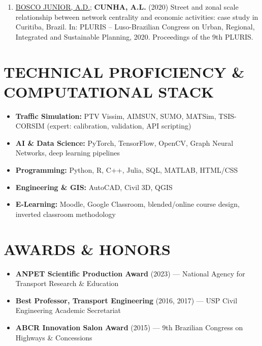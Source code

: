 \documentclass[
  10pt,
  a4paper,
  DIV=11,
  numbers=noendperiod]{scrartcl}
\providecommand{\tightlist}{%
  \setlength{\itemsep}{0pt}\setlength{\parskip}{0pt}}
\begin{document}
\begin{enumerate}
\def\labelenumi{\arabic{enumi}.}
\tightlist
\item
  \ul{BOSCO JUNIOR, A.D.}; \textbf{CUNHA, A.L.} (2020) Street and zonal
  scale relationship between network centrality and economic activities:
  case study in Curitiba, Brazil. In: PLURIS -- Luso-Brazilian Congress
  on Urban, Regional, Integrated and Sustainable Planning, 2020.
  Proceedings of the 9th PLURIS.
\end{enumerate}

\hrulefill

\section{TECHNICAL PROFICIENCY \& COMPUTATIONAL
STACK}\label{technical-proficiency-computational-stack}

\begin{itemize}
\tightlist
\item
  \textbf{Traffic Simulation:} PTV Vissim, AIMSUN, SUMO, MATSim,
  TSIS-CORSIM (expert: calibration, validation, API scripting)
\item
  \textbf{AI \& Data Science:} PyTorch, TensorFlow, OpenCV, Graph Neural
  Networks, deep learning pipelines
\item
  \textbf{Programming:} Python, R, C++, Julia, SQL, MATLAB, HTML/CSS
\item
  \textbf{Engineering \& GIS:} AutoCAD, Civil 3D, QGIS
\item
  \textbf{E-Learning:} Moodle, Google Classroom, blended/online course
  design, inverted classroom methodology
\end{itemize}

\hrulefill

\section{AWARDS \& HONORS}\label{awards-honors}

\begin{itemize}
\tightlist
\item
  \textbf{ANPET Scientific Production Award} (2023) --- National Agency
  for Transport Research \& Education
\item
  \textbf{Best Professor, Transport Engineering} (2016, 2017) --- USP
  Civil Engineering Academic Secretariat
\item
  \textbf{ABCR Innovation Salon Award} (2015) --- 9th Brazilian Congress
  on Highways \& Concessions
\end{itemize}
\end{document}
